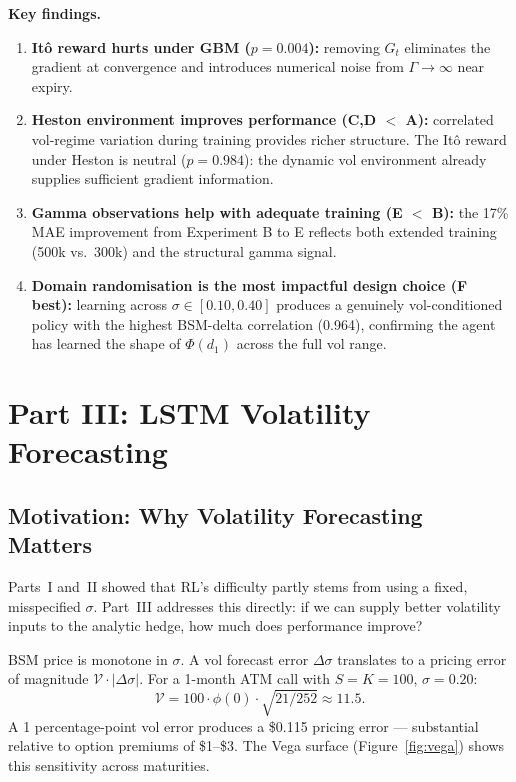 \documentclass[12pt,a4paper]{article}
\begin{document}
\textbf{Key findings.}
\begin{enumerate}[leftmargin=*]
  \item \textbf{It\^{o} reward hurts under GBM ($p=0.004$):} removing
        $G_t$ eliminates the gradient at convergence and introduces numerical
        noise from $\Gamma\to\infty$ near expiry.

  \item \textbf{Heston environment improves performance (C,D $<$ A):}
        correlated vol-regime variation during training provides richer
        structure.  The Itô reward under Heston is neutral ($p=0.984$):
        the dynamic vol environment already supplies sufficient gradient
        information.

  \item \textbf{Gamma observations help with adequate training (E $<$ B):}
        the 17\% MAE improvement from Experiment B to E reflects both extended
        training (500k vs.\ 300k) and the structural gamma signal.

  \item \textbf{Domain randomisation is the most impactful design choice (F
        best):} learning across $\sigma\in[0.10,0.40]$ produces a genuinely
        vol-conditioned policy with the highest BSM-delta correlation (0.964),
        confirming the agent has learned the shape of $\Phi(d_1)$ across the
        full vol range.
\end{enumerate}

\section{Part III: LSTM Volatility Forecasting}
\label{sec:p3}

\subsection{Motivation: Why Volatility Forecasting Matters}

Parts~I and~II showed that RL's difficulty partly stems from using a fixed,
misspecified $\sigma$.  Part~III addresses this directly: if we can supply better
volatility inputs to the analytic hedge, how much does performance improve?

BSM price is monotone in $\sigma$.  A vol forecast error $\Delta\sigma$
translates to a pricing error of magnitude $\mathcal{V}\cdot|\Delta\sigma|$.
For a 1-month ATM call with $S=K=100$, $\sigma=0.20$:
\begin{equation}
  \mathcal{V} = 100\cdot\phi(0)\cdot\sqrt{21/252} \approx 11.5.
\end{equation}
A 1 percentage-point vol error produces a \$0.115 pricing error ---
substantial relative to option premiums of \$1--\$3.  The Vega surface
(Figure~\ref{fig:vega}) shows this sensitivity across maturities.
\end{document}

